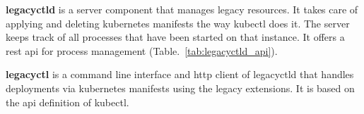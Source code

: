 \documentclass[../main.tex]{subfiles}
\begin{document}
    \textbf{\gls{legacyctld}} is a server component that manages legacy resources.
    It takes care of applying and deleting \gls{kubernetes} manifests the way \gls{kubectl} does it.
    The server keeps track of all processes that have been started on that instance.
    It offers a \acrshort{rest} \acrshort{api} for process management (Table.~\ref{tab:legacyctld_api}).

    

    \textbf{\gls{legacyctl}} is a command line interface and \acrshort{http} client of \gls{legacyctld} that handles deployments via \gls{kubernetes} manifests using the legacy extensions.
    It is based on the \acrshort{api} definition of \gls{kubectl}.
\end{document}
